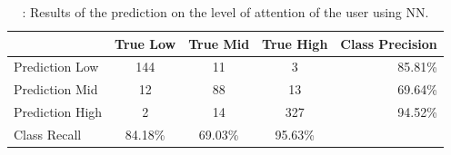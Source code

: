 \documentclass[journal]{IEEEtran}
\begin{document}
\begin{table}[H]
\caption{: Results of the prediction on the level of attention of the user using NN. }
\begin{tabular}{l*{3}{c}r}
									& True Low & True Mid & True High & Class Precision \\
\hline
Prediction Low  & 144 & 11 & 3 & 85.81\% \\
Prediction Mid  & 12 & 88 & 13 & 69.64\%  \\
Prediction High & 2 & 14 & 327 & 94.52\%  \\
\hline
Class Recall    & 84.18\% & 69.03\% & 95.63\% &  \\
\end{tabular}	
\end{table}


%
%



%
%
\end{document}
